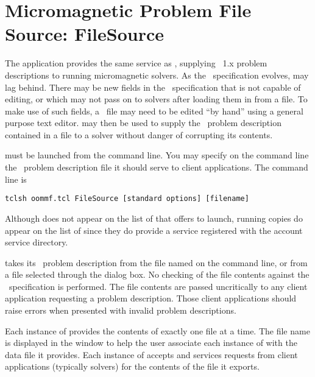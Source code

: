 \section{Micromagnetic Problem File Source: FileSource}\label{sec:filesource}

\begin{center}
\end{center}

The application  provides the same service as
{}, supplying
\MIF~1.x problem descriptions to running 
micromagnetic solvers.  As the \MIF\ specification evolves,
 may lag behind.  There may be new fields in the \MIF\
specification that  is not capable of editing, or which
\app{mmProbEd} may not pass on to solvers after loading them in from a
file.  To make use of such fields, a \MIF\ file may need to be edited
``by hand'' using a general purpose text editor.  \app{FileSource} may
then be used to supply the \MIF\ problem description contained in a file
to a solver without danger of corrupting its contents.

 must be launched from the command line. You may specify
on the command line the \MIF\ problem description file it should serve
to client applications.  The command line is
\begin{verbatim}
tclsh oommf.tcl FileSource [standard options] [filename]
\end{verbatim}

Although  does not appear on the list of
{} that  offers to launch, running copies do
appear on the list of \btn{Threads} since they do provide a service
registered with the account service directory.

 takes its \MIF\ problem description from the file named
on the command line, or from a file selected through the
 dialog box.  No checking of the file contents
against the \MIF\ specification is performed.  The file contents are
passed uncritically to any client application requesting a problem
description.  Those client applications should raise errors when
presented with invalid problem descriptions.

Each instance of  provides the contents of exactly one
file at a time.  The file name is displayed in the 
window to help the user associate each instance of  with
the data file it provides.  Each instance of \app{FileSource} accepts
and services requests from client applications (typically solvers) for
the contents of the file it exports.

